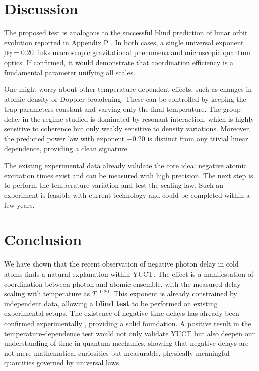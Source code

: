 \documentclass[12pt,a4paper]{article}
\newcommand{\betagamma}{\beta\gamma}
\begin{document}
	\section{Discussion}
	
	The proposed test is analogous to the successful blind prediction of lunar orbit evolution reported in Appendix P \cite{Yakushev2026b}. In both cases, a single universal exponent \(\betagamma = 0.20\) links macroscopic gravitational phenomena and microscopic quantum optics. If confirmed, it would demonstrate that coordination efficiency is a fundamental parameter unifying all scales.
	
	One might worry about other temperature-dependent effects, such as changes in atomic density or Doppler broadening. These can be controlled by keeping the trap parameters constant and varying only the final temperature. The group delay in the regime studied is dominated by resonant interaction, which is highly sensitive to coherence but only weakly sensitive to density variations. Moreover, the predicted power law with exponent \(-0.20\) is distinct from any trivial linear dependence, providing a clean signature.
	
	The existing experimental data already validate the core idea: negative atomic excitation times exist and can be measured with high precision. The next step is to perform the temperature variation and test the scaling law. Such an experiment is feasible with current technology and could be completed within a few years.
	
	\section{Conclusion}
	
	We have shown that the recent observation of negative photon delay in cold atoms finds a natural explanation within YUCT. The effect is a manifestation of coordination between photon and atomic ensemble, with the measured delay scaling with temperature as \(T^{-0.20}\). This exponent is already constrained by independent data, allowing a \textbf{blind test} to be performed on existing experimental setups. The existence of negative time delays has already been confirmed experimentally \cite{Angulo2024}, providing a solid foundation. A positive result in the temperature-dependence test would not only validate YUCT but also deepen our understanding of time in quantum mechanics, showing that negative delays are not mere mathematical curiosities but measurable, physically meaningful quantities governed by universal laws.
	
\end{document}
